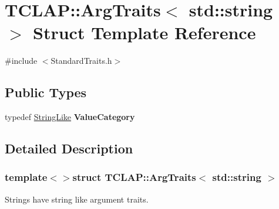 \hypertarget{struct_t_c_l_a_p_1_1_arg_traits_3_01std_1_1string_01_4}{\section{T\+C\+L\+A\+P\+:\+:Arg\+Traits$<$ std\+:\+:string $>$ Struct Template Reference}
\label{struct_t_c_l_a_p_1_1_arg_traits_3_01std_1_1string_01_4}
}


{\ttfamily \#include $<$Standard\+Traits.\+h$>$}

\subsection*{Public Types}
\begin{DoxyCompactItemize}
\item 
\hypertarget{struct_t_c_l_a_p_1_1_arg_traits_3_01std_1_1string_01_4_a719adeb18786516dd4b2a16525cf4536}{typedef \hyperlink{struct_t_c_l_a_p_1_1_string_like}{String\+Like} {\bfseries Value\+Category}}\label{struct_t_c_l_a_p_1_1_arg_traits_3_01std_1_1string_01_4_a719adeb18786516dd4b2a16525cf4536}

\end{DoxyCompactItemize}


\subsection{Detailed Description}
\subsubsection*{template$<$$>$struct T\+C\+L\+A\+P\+::\+Arg\+Traits$<$ std\+::string $>$}

Strings have string like argument traits. 